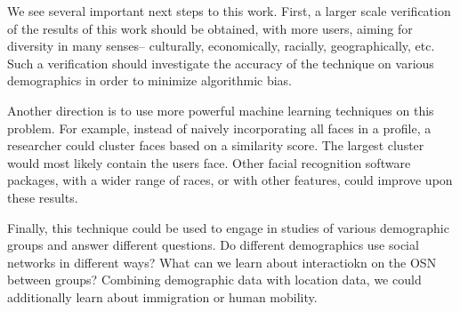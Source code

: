 We see several important next steps to this work.
First, a larger scale verification of the results of this work should be obtained, with more users, aiming for diversity in many senses-- culturally, economically, racially, geographically, etc.
Such a verification should investigate the accuracy of the technique on various demographics in order to minimize algorithmic bias. 

Another direction is to use more powerful machine learning techniques on this problem.
For example, instead of naively incorporating all faces in a profile, a researcher could cluster faces based on a similarity score.
The largest cluster would most likely contain the users face.
Other facial recognition software packages, with a wider range of races, or with other features, could improve upon these results.

Finally, this technique could be used to engage in studies of various demographic groups and answer different questions.
Do different demographics use social networks in different ways?
What can we learn about interactiokn on the OSN between groups?
Combining demographic data with location data, we could additionally learn about immigration or human mobility.
